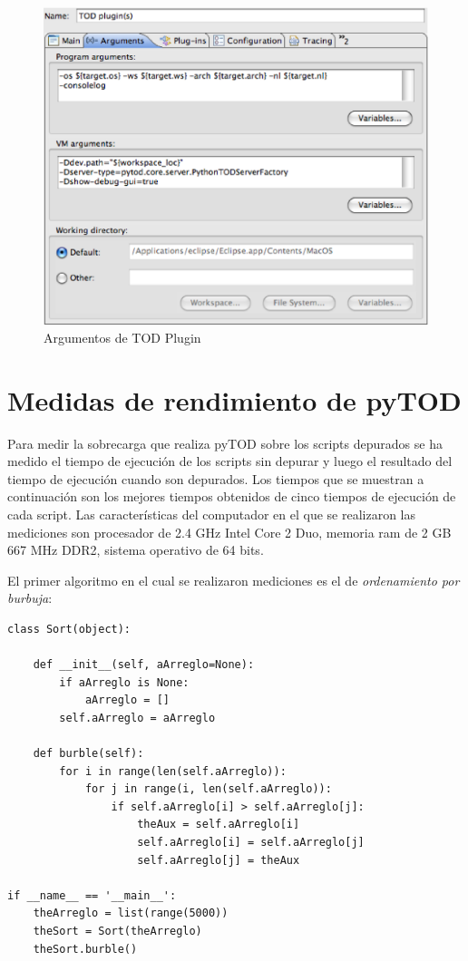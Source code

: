 \documentclass[12pt,legalpaper]{report}
\begin{document}
\begin{itemize}
\begin{itemize}
\begin{figure}[h]
	\centering
	\includegraphics[scale=0.5]{images/aspectoFuncionamiento/argsTODPlugin.eps}
	\caption{Argumentos de TOD Plugin}
\end{figure}
	\end{itemize}	
\end{itemize}
	
	\section{Medidas de rendimiento de pyTOD}
	
Para medir la sobrecarga que realiza pyTOD sobre los scripts depurados se ha medido el tiempo de ejecución de los scripts sin depurar y luego el resultado del tiempo de ejecución cuando son depurados.  Los tiempos que se muestran a continuación son los mejores tiempos obtenidos de cinco tiempos de ejecución de cada script.  Las características del computador en el que se realizaron las mediciones son procesador de 2.4 GHz Intel Core 2 Duo, memoria ram de 2 GB 667 MHz DDR2, sistema operativo de 64 bits.

El primer algoritmo en el cual se realizaron mediciones es el de \textit{ordenamiento por burbuja}:

\begin{singlespace}
\begin{lstlisting}[style=Python]
class Sort(object):
    
    def __init__(self, aArreglo=None):
        if aArreglo is None:
            aArreglo = []
        self.aArreglo = aArreglo
    
    def burble(self):
        for i in range(len(self.aArreglo)):
            for j in range(i, len(self.aArreglo)):
                if self.aArreglo[i] > self.aArreglo[j]:
                    theAux = self.aArreglo[i]
                    self.aArreglo[i] = self.aArreglo[j]
                    self.aArreglo[j] = theAux
    
if __name__ == '__main__':
    theArreglo = list(range(5000))
    theSort = Sort(theArreglo)
    theSort.burble()
\end{lstlisting}
\end{singlespace}	
\end{document}
